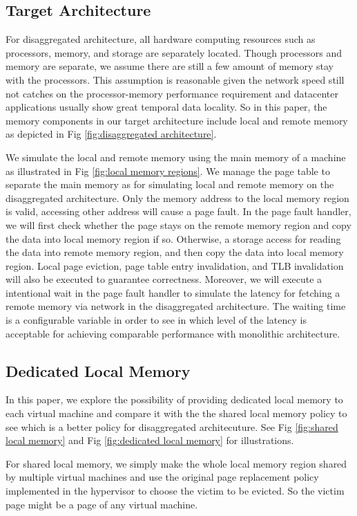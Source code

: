 \documentclass[twocolumn]{article}
\begin{document}
\subsection{Target Architecture}
For disaggregated architecture, all hardware computing resources such as processors, memory, and storage are separately located. Though processors and memory are separate, we assume there are still a few amount of memory stay with the processors. This assumption is reasonable given the network speed still not catches on the processor-memory performance requirement\cite{Network_requirement} and datacenter applications usually show great temporal data locality\cite{NN_load,MapReduce_load}. So in this paper, the memory components in our target architecture include local and remote memory as depicted in Fig \ref{fig:disaggregated architecture}.

We simulate the local and remote memory using the main memory of a machine as illustrated in Fig \ref{fig:local memory regions}. We manage the page table to separate the main memory as for simulating local and remote memory on the disaggregated architecture. Only the memory address to the local memory region is valid, accessing other address will cause a page fault. In the page fault handler, we will first check whether the page stays on the remote memory region and copy the data into local memory region if so. Otherwise, a storage access for reading the data into remote memory region, and then copy the data into local memory region. Local page eviction, page table entry invalidation, and TLB invalidation will also be executed to guarantee correctness. Moreover, we will execute a intentional wait in the page fault handler to simulate the latency for fetching a remote memory via network in the disaggregated architecture. The waiting time is a configurable variable in order to see in which level of the latency is acceptable for achieving comparable performance with monolithic architecture.

\subsection{Dedicated Local Memory}
In this paper, we explore the possibility of providing dedicated local memory to each virtual machine and compare it with the the shared local memory policy to see which is a better policy for disaggregated architecuture. See Fig \ref{fig:shared local memory} and Fig \ref{fig:dedicated local memory} for illustrations.

For shared local memory, we simply make the whole local memory region shared by multiple virtual machines and use the original page replacement policy implemented in the hypervisor to choose the victim to be evicted. So the victim page might be a page of any virtual machine.
\end{document}
